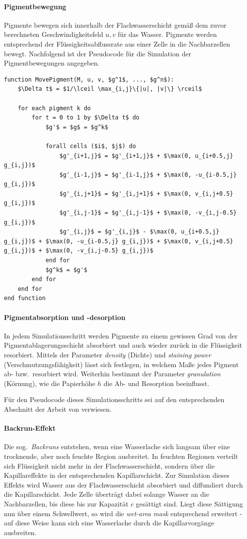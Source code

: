 \paragraph{Pigmentbewegung}
Pigmente bewegen sich innerhalb der Flachwasserschicht gemäß dem zuvor
berechneten Geschwindigkeitsfeld $u, v$ für das Wasser. Pigmente werden
entsprechend der Flüssigkeitsabflussrate aus einer Zelle in die Nachbarzellen
bewegt. Nachfolgend ist der Pseudocode für die Simulation der Pigmentbewegungen
angegeben. 

\begin{lstlisting}[caption={Pigmentbewegung}, label={lst:pigmentmovement}, %
morekeywords={forall}]
function MovePigment(M, u, v, $g^1$, ..., $g^n$):
	$\Delta t$ = $1/\lceil \max_{i,j}\{|u|, |v|\} \rceil$

	for each pigment k do
		for t = 0 to 1 by $\Delta t$ do
			$g'$ = $g$ = $g^k$

			forall cells ($i$, $j$) do
				$g'_{i+1,j}$ = $g'_{i+1,j}$ + $\max(0, u_{i+0.5,j} g_{i,j})$
				$g'_{i-1,j}$ = $g'_{i-1,j}$ + $\max(0, -u_{i-0.5,j} g_{i,j})$
				$g'_{i,j+1}$ = $g'_{i,j+1}$ + $\max(0, v_{i,j+0.5} g_{i,j})$
				$g'_{i,j-1}$ = $g'_{i,j-1}$ + $\max(0, -v_{i,j-0.5} g_{i,j})$
				$g'_{i,j}$ = $g'_{i,j}$ - $\max(0, u_{i+0.5,j} g_{i,j})$ + $\max(0, -u_{i-0.5,j} g_{i,j})$ + $\max(0, v_{i,j+0.5} g_{i,j})$ + $\max(0, -v_{i,j-0.5} g_{i,j})$
			end for
			$g^k$ = $g'$
		end for
	end for
end function
\end{lstlisting}

\paragraph{Pigmentabsorption und -desorption}
In jedem Simulationsschritt werden Pigmente zu einem gewissen Grad von der 
Pigmentablagerungsschicht absorbiert und auch wieder zurück in die Flüssigkeit 
resorbiert. Mittels der Parameter \textsl{density} (Dichte) und 
\textsl{staining power} (Verschmutzungsfähigkeit) lässt sich festlegen, in 
welchem Maße jedes Pigment ab- bzw.\ resorbiert wird. Weiterhin bestimmt der 
Parameter \textsl{granulation} (Körnung), wie die Papierhöhe $h$ die Ab- und 
Resorption beeinflusst.

Für den Pseudocode dieses Simulationsschritts sei auf den entsprechenden 
Abschnitt der Arbeit von \cite{Curtis1997} verwiesen.

\paragraph{Backrun-Effekt}
Die sog.\ \textsl{Backruns} entstehen, wenn eine Wasserlache sich langsam über
eine trocknende, aber noch feuchte Region ausbreitet. In feuchten Regionen
verteilt sich Flüssigkeit nicht mehr in der Flachwasserschicht, sondern über die
Kapillareffekte in der entsprechenden Kapillarschicht.
Zur Simulation dieses Effekts wird Wasser aus der Flachwasserschicht absorbiert
und diffundiert durch die Kapillarschicht. Jede Zelle überträgt dabei solange
Wasser an die Nachbarzellen, bis diese bis zur Kapazität $c$ gesättigt sind.
Liegt diese Sättigung nun über einem Schwellwert, so wird die \textsl{wet-area
mask} entsprechend erweitert - auf diese Weise kann sich eine Wasserlache durch
die Kapillarvorgänge ausbreiten.


